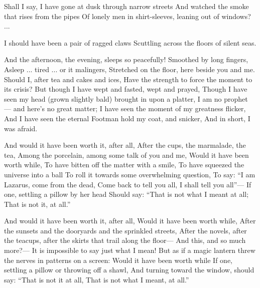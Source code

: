 \documentclass[fontsize=9, a5paper]{scrbook}
\begin{document}
\begin{poem}
	\begin{stanza}
		Shall I say, I have gone at dusk through narrow streets\verseline
		And watched the smoke that rises from the pipes\verseline
		Of lonely men in shirt-sleeves, leaning out of windows? ...
	\end{stanza}

	\begin{stanza}
		I should have been a pair of ragged claws\verseline
		Scuttling across the floors of silent seas.
	\end{stanza}
	
	\begin{stanza}
		And the afternoon, the evening, sleeps so peacefully!\verseline
		Smoothed by long fingers,\verseline
		Asleep ... tired ... or it malingers,\verseline
		Stretched on the floor, here beside you and me.\verseline
		Should I, after tea and cakes and ices,\verseline
		Have the strength to force the moment to its crisis?\verseline
		But though I have wept and fasted, wept and prayed,\verseline
		Though I have seen my head (grown slightly bald) \verseline
			\verseindent brought in upon a platter,\verseline
		I am no prophet — and here’s no great matter;\verseline
		I have seen the moment of my greatness flicker,\verseline
		And I have seen the eternal Footman hold my coat, \verseline
			\verseindent and snicker,\verseline
		And in short, I was afraid.
	\end{stanza}

	\pagebreak
	
	\begin{stanza}
		And would it have been worth it, after all,\verseline
		After the cups, the marmalade, the tea,\verseline
		Among the porcelain, among some talk of you and me,\verseline
		Would it have been worth while,\verseline
		To have bitten off the matter with a smile,\verseline
		To have squeezed the universe into a ball\verseline
		To roll it towards some overwhelming question,\verseline
		To say: “I am Lazarus, come from the dead,\verseline
		Come back to tell you all, I shall tell you all”—\verseline
		If one, settling a pillow by her head\verseline
		               \verseindent Should say: “That is not what I meant at all;\verseline
		               \verseindent That is not it, at all.”
	\end{stanza}

	\begin{stanza}
		And would it have been worth it, after all,\verseline
		Would it have been worth while,\verseline
		After the sunsets and the dooryards and the sprinkled streets,\verseline
		After the novels, after the teacups, \verseline
			\verseindent after the skirts that trail along the floor—\verseline
		And this, and so much more?—\verseline
		It is impossible to say just what I mean!\verseline
		But as if a magic lantern threw the nerves in patterns \verseline
			\verseindent on a screen:\verseline
		Would it have been worth while\verseline
		If one, settling a pillow or throwing off a shawl,\verseline
		And turning toward the window, should say:\verseline
		               \verseindent “That is not it at all,\verseline
		               \verseindent That is not what I meant, at all.”
	\end{stanza}
	

\end{poem}
\end{document}
